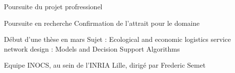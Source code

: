 \begin{frame}{Poursuite du projet profressionel}

    \begin{block}{Poursuite en recherche}
        Confirmation de l'attrait pour le domaine
        
    \end{block}

    \begin{block}{Début d'une thèse en mars}
            Sujet : Ecological and economic logistics service network design : Models and Decision Support Algorithms

            Equipe INOCS, au sein de l'INRIA Lille, dirigé par Frederic Semet
        
    \end{block}   

\end{frame}